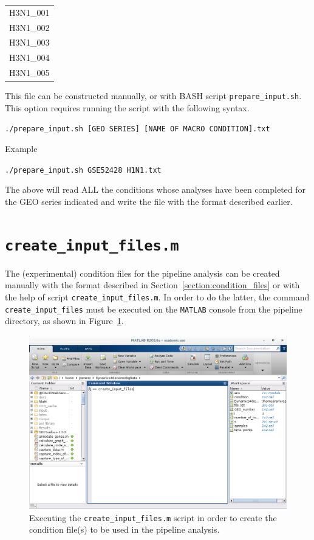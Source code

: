 \documentclass[final,letterpaper,twoside,12pt]{article}
\begin{document}
\begin{center}
\begin{tabular}{ c }

H3N1\_001 \\
H3N1\_002 \\
H3N1\_003 \\
H3N1\_004 \\
H3N1\_005 \\

\end{tabular}
\end{center}


\par This file can be constructed manually, or with BASH script \texttt{prepare\_input.sh}. This option requires running the script with the following syntax.

\texttt{./prepare\_input.sh [GEO SERIES] [NAME OF MACRO CONDITION].txt}

\par Example

\texttt{./prepare\_input.sh GSE52428 H1N1.txt}

\par The above will read ALL the conditions whose analyses have been completed for the GEO series indicated and write the file with the format described earlier.

\section{\texttt{create\_input\_files.m}}
\label{section:user_functions}

\par The (experimental) condition files for the pipeline analysis can be created manually with the format described in Section~\ref{section:condition_files} or with the help of script \texttt{create\_input\_files.m}. In order to do the latter, the command \texttt{create\_input\_files} must be executed on the \texttt{MATLAB} console from the pipeline directory, as shown in Figure~\ref{figure:create_files}.


\begin{figure}[h]
\includegraphics[width=\textwidth]{create_files}
\caption{Executing the \texttt{create\_input\_files.m} script in order to create the condition file(s) to be used in the pipeline analysis.}
\label{figure:create_files}
\end{figure}
\end{document}
